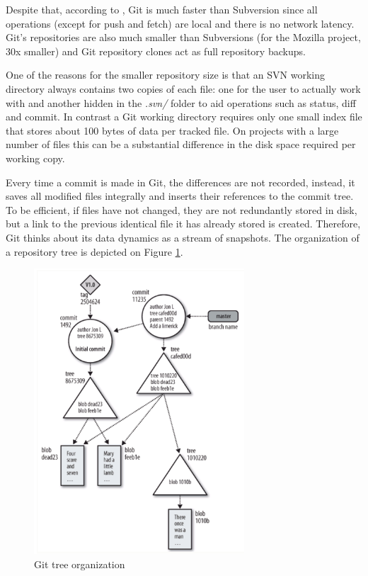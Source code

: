 Despite that, according to \citet{ref:gitwiki}, Git is much faster than Subversion since all operations (except for push and fetch) are local and there is no network latency. Git's repositories are also much smaller than Subversions (for the Mozilla project, 30x smaller) and Git repository clones act as full repository backups.

One of the reasons for the smaller repository size is that an SVN working directory always contains two copies of each file: one for the user to actually work with and another hidden in the \textit{.svn/} folder to aid operations such as status, diff and commit. In contrast a Git working directory requires only one small index file that stores about 100 bytes of data per tracked file. On projects with a large number of files this can be a substantial difference in the disk space required per working copy.

Every time a commit is made in Git, the differences are not recorded, instead, it saves all modified files integrally and inserts their references to the commit tree. To be efficient, if files have not changed, they are not redundantly stored in disk, but a link to the previous identical file it has already stored is created. Therefore, Git thinks about its data dynamics as a stream of snapshots. The organization of a repository tree is depicted on Figure \ref{fig:git_architecture}.

\begin{figure}[h]
	\centering
	\includegraphics[width=0.7\textwidth]{figures/git_architecture.png}
	\caption{Git tree organization}
	\label{fig:git_architecture}
\end{figure}

